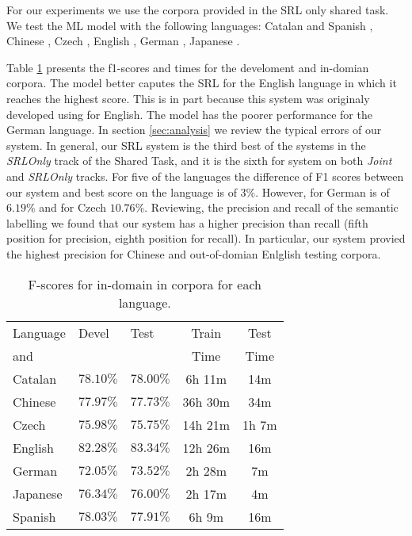 For our experiments we use the corpora provided in the SRL only shared task. We 
test the ML model with the following languages: Catalan and Spanish 
\citep{catalan-and-spanish-data} , Chinese \citep{chinese-data}, Czech 
\citep{czech-data}, English \citep{english-data}, German \citep{german-data}, 
Japanese \citep{japanese-data}. 

Table \ref{tbl:results} presents the f1-scores and times for the develoment and
in-domian corpora. The model better caputes the SRL for the English language in 
which it reaches the highest score. This is in part because this system was 
originaly developed using for English. The model has the poorer performance for 
the German language. In section \ref{sec:analysis} we review the typical errors 
of our system. In general, our SRL system is the third best of the systems in 
the \emph{SRLOnly} track of the Shared Task, and it is the sixth for system on 
both \emph{Joint} and \emph{SRLOnly} tracks. For five of the languages the 
difference of F1 scores between our system and best score on the language is of 
$3\%$.  However, for German is of  $6.19\%$ and for Czech $10.76\%$. Reviewing, 
the precision and recall of the semantic labelling we found that our system has 
a higher precision than recall (fifth position for precision, eighth position 
for recall).  In particular, our system provied the highest precision for 
Chinese and out-of-domian Enlglish testing corpora.    

\begin{table}
\begin{center}
\small
\begin{tabular}{|l|l|l|c|c|}\hline
Language           & Devel        & Test       & Train   & Test  \\%
and %
                &              &            & Time    & Time  \\\hline\hline
Catalan         & $78.10\%$    & $78.00\%$  & 6h 11m  & 14m   \\ %
Chinese         & $77.97\%$    & $77.73\%$  & 36h 30m & 34m   \\ %
Czech           & $75.98\%$    & $75.75\%$  & 14h 21m & 1h 7m \\ %
English         & $82.28\%$    & $83.34\%$  & 12h 26m & 16m   \\ %
German          & $72.05\%$    & $73.52\%$  & 2h 28m  & 7m    \\ %
Japanese        & $76.34\%$    & $76.00\%$  & 2h 17m  & 4m    \\ %
Spanish         & $78.03\%$    & $77.91\%$  & 6h 9m   & 16m   \\ %
\hline
\end{tabular}
\caption{F-scores for in-domain in corpora for each language.}
\label{tbl:results}
\normalsize
\end{center}
\end{table}


